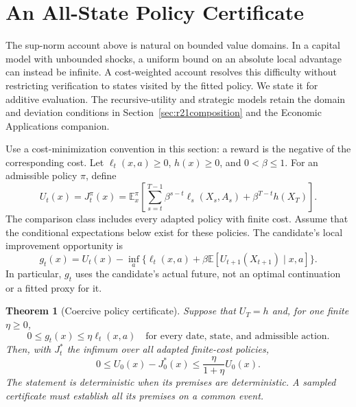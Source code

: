 \documentclass[ecta,nameyear,draft]{econsocart}
\newtheorem{theorem}{Theorem}
\theoremstyle{definition}
\theoremstyle{remark}
\newcommand{\E}{\mathbb E}
\begin{document}
\section{An All-State Policy Certificate}\label{sec:r23policy}
The sup-norm account above is natural on bounded value domains. In a capital
model with unbounded shocks, a uniform bound on an absolute local advantage
can instead be infinite. A cost-weighted account resolves this difficulty
without restricting verification to states visited by the fitted policy.
We state it for additive evaluation. The recursive-utility and strategic
models retain the domain and deviation conditions in
Section~\ref{sec:r21composition} and the Economic Applications companion.

Use a cost-minimization convention in this section: a reward is the negative
of the corresponding cost. Let $\ell_t(x,a)\geq0$, $h(x)\geq0$, and
$0<\beta\leq1$. For an admissible policy $\pi$, define
\begin{equation}
 U_t(x)=J_t^\pi(x)=\E_x^\pi\left[
 \sum_{s=t}^{T-1}\beta^{s-t}\ell_s(X_s,A_s)+\beta^{T-t}h(X_T)\right].
 \label{eq:r23ownvalue}
\end{equation}
The comparison class includes every adapted policy with finite cost. Assume
that the conditional expectations below exist for these policies. The
candidate's local improvement opportunity is
\begin{equation}
 g_t(x)=U_t(x)-\inf_a\{\ell_t(x,a)+\beta\E[U_{t+1}(X_{t+1})\mid x,a]\}.
 \label{eq:r23advantage}
\end{equation}
In particular, $g_t$ uses the candidate's actual future, not an optimal
continuation or a fitted proxy for it.

\begin{theorem}[Coercive policy certificate]\label{thm:r23coercive}
Suppose that $U_T=h$ and, for one finite $\eta\geq0$,
\begin{equation}
 0\leq g_t(x)\leq\eta\ell_t(x,a)
 \quad\text{for every date, state, and admissible action.}
 \label{eq:r23coercivity}
\end{equation}
Then, with $J_t^*$ the infimum over all adapted finite-cost policies,
\begin{equation}
 0\leq U_0(x)-J_0^*(x)
 \leq\frac{\eta}{1+\eta}U_0(x).
 \label{eq:r23relative}
\end{equation}
The statement is deterministic when its premises are deterministic. A
sampled certificate must establish all its premises on a common event.
\end{theorem}
\end{document}
